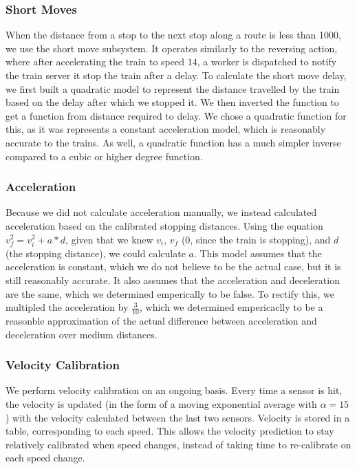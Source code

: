 \documentclass{article}
\begin{document}
\subsubsection{Short Moves} 
When the distance from a stop to the next stop along a route is less than 1000, we use the short move subsystem. It operates similarly to the reversing action, where after accelerating the train to speed $14$, a worker is dispatched to notify the train server it stop the train after a delay.
To calculate the short move delay, we first built a quadratic model to represent the distance travelled by the train based on the delay after which we stopped it. We then inverted the function to get a function from distance required to delay.
We chose a quadratic function for this, as it was represents a constant acceleration model, which is reasonably accurate to the trains. As well, a quadratic function has a much simpler inverse compared to a cubic or higher degree function. 

\subsubsection{Acceleration}
Because we did not calculate acceleration manually, we instead calculated acceleration based on the calibrated stopping distances. 
Using the equation $v_f^2 = v_i^2 + a*d$, given that we knew $v_i$, $v_f$ (0, since the train is stopping), and $d$ (the stopping distance), we could calculate $a$. 
This model assumes that the acceleration is constant, which we do not believe to be the actual case, but it is still reasonably accurate. It also assumes that the acceleration and deceleration are the same, which we determined emperically to be false.
To rectify this, we multipled the acceleration by $\frac{3}{10}$, which we determined empericaclly to be a reasonble approximation of the actual difference between acceleration and deceleration over medium distances. 

\subsubsection{ Velocity Calibration }
We perform velocity calibration on an ongoing basis. Every time a sensor is hit, the velocity is updated (in the form of a moving exponential average with $\alpha = 15$) with the velocity calculated between the last two sensors.
Velocity is stored in a table, corresponding to each speed. This allows the velocity prediction to stay relatively calibrated when speed changes, instead of taking time to re-calibrate on each speed change.
\end{document}
